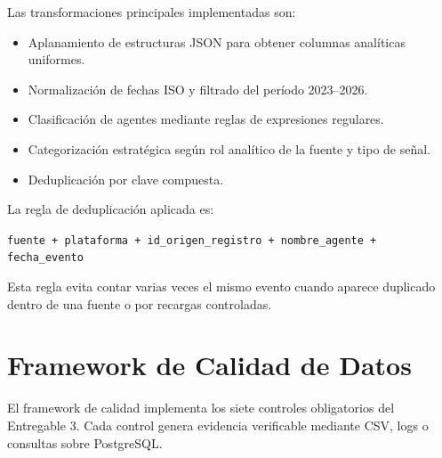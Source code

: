 \documentclass[12pt,a4paper]{article}
\begin{document}
Las transformaciones principales implementadas son:

\begin{itemize}[leftmargin=1.2cm]
    \item Aplanamiento de estructuras JSON para obtener columnas anal\'iticas uniformes.
    \item Normalizaci\'on de fechas ISO y filtrado del per\'iodo 2023--2026.
    \item Clasificaci\'on de agentes mediante reglas de expresiones regulares.
    \item Categorizaci\'on estrat\'egica seg\'un rol anal\'itico de la fuente y tipo de se\~nal.
    \item Deduplicaci\'on por clave compuesta.
\end{itemize}

La regla de deduplicaci\'on aplicada es:

\begin{center}
\texttt{fuente + plataforma + id\_origen\_registro + nombre\_agente + fecha\_evento}
\end{center}

Esta regla evita contar varias veces el mismo evento cuando aparece duplicado dentro de una fuente o por recargas controladas.

\section{Framework de Calidad de Datos}

El framework de calidad implementa los siete controles obligatorios del Entregable 3. Cada control genera evidencia verificable mediante CSV, logs o consultas sobre PostgreSQL.
\end{document}
